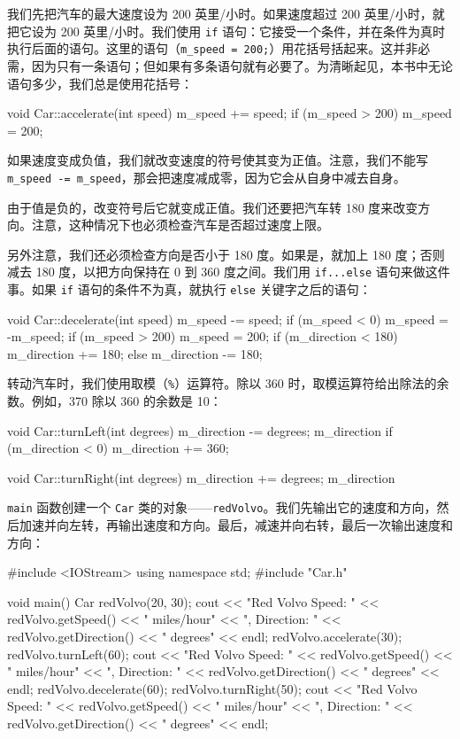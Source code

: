 我们先把汽车的最大速度设为 200 英里/小时。如果速度超过 200 英里/小时，就把它设为 200 英里/小时。我们使用 \texttt{if} 语句：它接受一个条件，并在条件为真时执行后面的语句。这里的语句（\texttt{m\_speed = 200;}）用花括号括起来。这并非必需，因为只有一条语句；但如果有多条语句就有必要了。为清晰起见，本书中无论语句多少，我们总是使用花括号：

\begin{codebox}
void Car::accelerate(int speed) {
  m_speed += speed;
  if (m_speed > 200) {
    m_speed = 200;
  }
}
\end{codebox}

如果速度变成负值，我们就改变速度的符号使其变为正值。注意，我们不能写 \texttt{m\_speed -= m\_speed}，那会把速度减成零，因为它会从自身中减去自身。

由于值是负的，改变符号后它就变成正值。我们还要把汽车转 180 度来改变方向。注意，这种情况下也必须检查汽车是否超过速度上限。

另外注意，我们还必须检查方向是否小于 180 度。如果是，就加上 180 度；否则减去 180 度，以把方向保持在 0 到 360 度之间。我们用 \texttt{if...else} 语句来做这件事。如果 \texttt{if} 语句的条件不为真，就执行 \texttt{else} 关键字之后的语句：

\begin{codebox}
void Car::decelerate(int speed) {
  m_speed -= speed;
  if (m_speed < 0) {
    m_speed = -m_speed;
    if (m_speed > 200) {
      m_speed = 200;
    }
    if (m_direction < 180) {
      m_direction += 180;
    }
    else {
      m_direction -= 180;
    }
  }
}
\end{codebox}

转动汽车时，我们使用取模（\texttt{\%}）运算符。除以 360 时，取模运算符给出除法的余数。例如，370 除以 360 的余数是 10：

\begin{codebox}
void Car::turnLeft(int degrees) {
  m_direction -= degrees;
  m_direction %
  if (m_direction < 0) {
    m_direction += 360;
  }
}

void Car::turnRight(int degrees) {
  m_direction += degrees;
  m_direction %
}
\end{codebox}

\texttt{main} 函数创建一个 \texttt{Car} 类的对象——\texttt{redVolvo}。我们先输出它的速度和方向，然后加速并向左转，再输出速度和方向。最后，减速并向右转，最后一次输出速度和方向：

\medskip{}

\begin{codebox}
#include <IOStream>
using namespace std;
#include "Car.h"

void main() {
  Car redVolvo(20, 30);
  cout << "Red Volvo Speed: " << redVolvo.getSpeed()
       << " miles/hour" << ", Direction: "
       << redVolvo.getDirection() << " degrees" << endl;
  redVolvo.accelerate(30);
  redVolvo.turnLeft(60);
  cout << "Red Volvo Speed: " << redVolvo.getSpeed()
       << " miles/hour" << ", Direction: "
       << redVolvo.getDirection() << " degrees" << endl;
  redVolvo.decelerate(60);
  redVolvo.turnRight(50);
  cout << "Red Volvo Speed: " << redVolvo.getSpeed()
       << " miles/hour" << ", Direction: "
       << redVolvo.getDirection() << " degrees" << endl;
}
\end{codebox}


